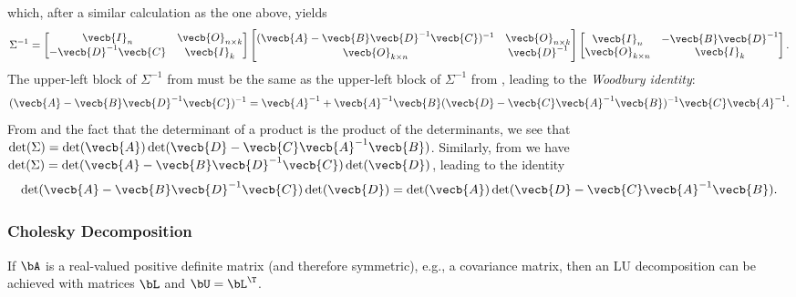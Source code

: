 which, after a similar calculation as the one above, yields
\begin{equation} \label{eq:BlockInverseUL}
	\Sigma^{-1} =
	\begin{bmatrix}
		\vecb{I}_n              & \vecb{O}_{n \times k} \\
		-\vecb{D}^{-1} \vecb{C} & \vecb{I}_k
	\end{bmatrix}
	\begin{bmatrix}
		(\vecb{A} - \vecb{B} \vecb{D}^{-1} \vecb{C})^{-1} & \vecb{O}_{n \times k} \\
		\vecb{O}_{k \times n}                             & \vecb{D}^{-1}
	\end{bmatrix}
	\begin{bmatrix}
		\vecb{I}_n            & -\vecb{B} \vecb{D}^{-1} \\
		\vecb{O}_{k \times n} & \vecb{I}_k
	\end{bmatrix}.
\end{equation}
The upper-left block of $\Sigma^{-1}$ from  must be the same as the upper-left block of $\Sigma^{-1}$ from , leading to the \textit{Woodbury identity}:
\begin{equation} \label{eq:WoodburyIdentity}
	(\vecb{A} - \vecb{B} \vecb{D}^{-1} \vecb{C})^{-1} = \vecb{A}^{-1} + \vecb{A}^{-1} \vecb{B} (\vecb{D} - \vecb{C} \vecb{A}^{-1} \vecb{B})^{-1} \vecb{C} \vecb{A}^{-1}.
\end{equation}
From  and the fact that the determinant of a product is the product of the determinants, we see that $\det(\Sigma) = \det(\vecb{A}) \det(\vecb{D} - \vecb{C} \vecb{A}^{-1} \vecb{B})$. Similarly, from  we have $\det(\Sigma) = \det(\vecb{A} - \vecb{B} \vecb{D}^{-1} \vecb{C}) \det(\vecb{D})$, leading to the identity
\begin{equation} \label{eq:DeterminantIdentity}
	\det(\vecb{A} - \vecb{B} \vecb{D}^{-1} \vecb{C}) \det(\vecb{D}) = \det(\vecb{A}) \det(\vecb{D} - \vecb{C} \vecb{A}^{-1} \vecb{B}).
\end{equation}

\subsubsection{Cholesky Decomposition}

If $\bA$ is a real-valued positive definite matrix (and therefore symmetric), e.g., a covariance matrix, then an LU decomposition can be achieved with matrices $\bL$ and $\bU = \bL^\T$.

